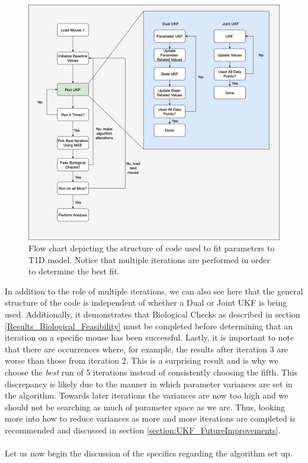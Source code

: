 \begin{figure}[H]
    \centering
    \includegraphics[width=17cm]{Kalman_Filter_Images/Workflow_FlowChart.jpg}
    \caption{Flow chart depicting the structure of code used to fit parameters to T1D model. Notice that multiple iterations are performed in order to determine the best fit.}
    \label{fig:T1D_CodeFlow}
\end{figure}
In addition to the role of multiple iterations, we can also see here that the general structure of the code is independent of whether a Dual or Joint UKF is being used. Additionally, it demonstrates that Biological Checks as described in section \ref{Results_Biological_Feasibility} must be completed before determining that an iteration on a specific mouse has been successful. Lastly, it is important to note that there are occurrences where, for example, the results after iteration 3 are worse than those from iteration 2. This is a surprising result and is why we choose the \emph{best} run of 5 iterations instead of consistently choosing the fifth. This discrepancy is likely due to the manner in which parameter variances are set in the algorithm. Towards later iterations the variances are now too high and we should not be searching as much of parameter space as we are. Thus, looking more into how to reduce variances as more and more iterations are completed is recommended and discussed in section \ref{section:UKF_FutureImprovements}.\\
\\
Let us now begin the discussion of the specifics regarding the algorithm set up.




